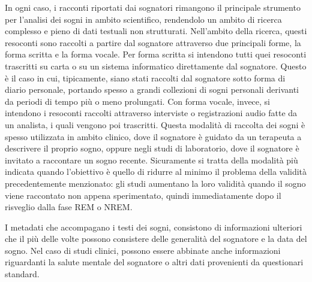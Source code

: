 In ogni caso, i racconti riportati dai sognatori rimangono il principale strumento per l'analisi dei sogni
in ambito scientifico, rendendolo un ambito di ricerca complesso e pieno di dati testuali non strutturati.
Nell'ambito della ricerca, questi resoconti sono raccolti a partire dal sognatore attraverso due principali
forme, la forma scritta e la forma vocale.
Per forma scritta si intendono tutti quei resoconti trascritti su carta o su un sistema informatico
direttamente dal sognatore.
Questo è il caso in cui, tipicamente, siano stati raccolti dal sognatore sotto forma di diario personale,
portando spesso a grandi collezioni di sogni personali derivanti da periodi di tempo più o meno prolungati.
Con forma vocale, invece, si intendono i resoconti raccolti attraverso interviste o registrazioni audio fatte
da un analista, i quali vengono poi trascritti.
Questa modalità di raccolta dei sogni è spesso utilizzata in ambito clinico, dove il sognatore è guidato da un
terapeuta a descrivere il proprio sogno, oppure negli studi di laboratorio, dove il sognatore è invitato
a raccontare un sogno recente.
Sicuramente si tratta della modalità più indicata quando l'obiettivo è quello di ridurre al minimo il problema
della validità precedentemente menzionato: gli studi aumentano la loro validità quando il sogno viene raccontato
non appena sperimentato, quindi immediatamente dopo il risveglio dalla fase REM o NREM.

I metadati che accompagano i testi dei sogni, consistono di informazioni ulteriori che il più delle volte possono
consistere delle generalità del sognatore e la data del sogno.
Nel caso di studi clinici, possono essere abbinate anche informazioni riguardanti la salute mentale del sognatore o
altri dati provenienti da questionari standard. \newline

